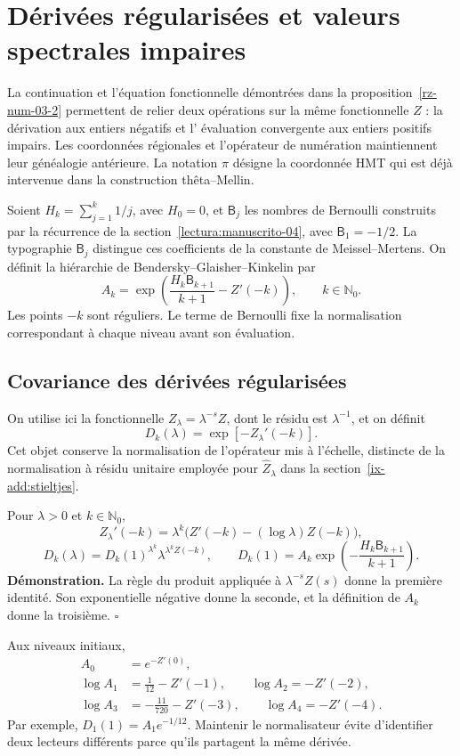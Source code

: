 \section{Dérivées régularisées et valeurs spectrales impaires}
\label{ix-add:bendersky}

La continuation et l'équation fonctionnelle démontrées dans la
proposition~\ref{rz-num-03-2} permettent de relier deux opérations
sur la même fonctionnelle $Z$ : la dérivation aux entiers négatifs et l'
évaluation convergente aux entiers positifs impairs. Les coordonnées
régionales et l'opérateur de numération maintiennent leur généalogie antérieure.
La notation $\pi$ désigne la coordonnée HMT qui est déjà intervenue dans la
construction thêta--Mellin.

Soient $H_k=\sum_{j=1}^k1/j$, avec $H_0=0$, et $\mathsf B_j$ les nombres de Bernoulli construits par la récurrence de la section~\ref{lectura:manuscrito-04}, avec $\mathsf B_1=-1/2$. La typographie $\mathsf B_j$ distingue ces coefficients de la constante de Meissel--Mertens. On définit la hiérarchie de Bendersky--Glaisher--Kinkelin par
\[
 A_k=\exp\!\left(\frac{H_k\mathsf B_{k+1}}{k+1}-Z'(-k)\right),
 \qquad k\in\mathbb N_0.
\]
Les points $-k$ sont réguliers. Le terme de Bernoulli fixe la
normalisation correspondant à chaque niveau avant son évaluation.

\subsection{Covariance des dérivées régularisées}
On utilise ici la fonctionnelle $Z_\lambda=\lambda^{-s}Z$, dont le résidu
est $\lambda^{-1}$, et on définit
\[
 D_k(\lambda)=\exp[-Z_\lambda'(-k)].
\]
Cet objet conserve la normalisation de l'opérateur mis à l'échelle, distincte de la normalisation à résidu unitaire employée pour $\widehat Z_\lambda$ dans la section~\ref{ix-add:stieltjes}.

Pour $\lambda>0$ et $k\in\mathbb N_0$,
\[
 Z_\lambda'(-k)=\lambda^k
       \bigl(Z'(-k)-(\log\lambda)Z(-k)\bigr),
\]
\[
 D_k(\lambda)=D_k(1)^{\lambda^k}
               \lambda^{\lambda^k Z(-k)},\qquad
 D_k(1)=A_k\exp\!\left(-\frac{H_k\mathsf B_{k+1}}{k+1}\right).
\]
\textbf{Démonstration.} La règle du produit appliquée à
$\lambda^{-s}Z(s)$ donne la première identité. Son exponentielle négative
donne la seconde, et la définition de $A_k$ donne la troisième.
\hfill$\square$

Aux niveaux initiaux,
\[
\begin{aligned}
 A_0&=e^{-Z'(0)},\\
 \log A_1&=\frac1{12}-Z'(-1),\qquad \log A_2=-Z'(-2),\\
 \log A_3&=-\frac{11}{720}-Z'(-3),\qquad \log A_4=-Z'(-4).
\end{aligned}
\]
Par exemple, $D_1(1)=A_1e^{-1/12}$. Maintenir le normalisateur évite
d'identifier deux lecteurs différents parce qu'ils partagent la même dérivée.

